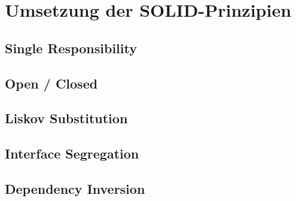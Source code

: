 \section{Umsetzung der SOLID-Prinzipien}{
	\subsection{Single Responsibility}
	\subsection{Open / Closed}
	\subsection{Liskov Substitution}
	\subsection{Interface Segregation}
	\subsection{Dependency Inversion}
	

}